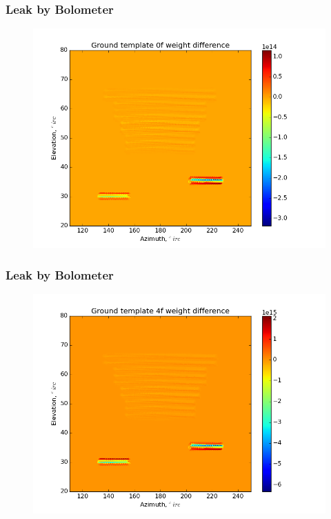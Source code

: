 \documentclass{beamer}
\begin{document}
\begin{frame}
\frametitle{Leak by Bolometer}
\begin{figure}
\includegraphics[width=0.9\linewidth]{dw0_gt_LEAK_BY_BOLO.png}
\end{figure}
\end{frame}

\begin{frame}
\frametitle{Leak by Bolometer}
\begin{figure}
\includegraphics[width=0.9\linewidth]{dw4_gt_LEAK_BY_BOLO.png}
\end{figure}
\end{frame}
\end{document}

